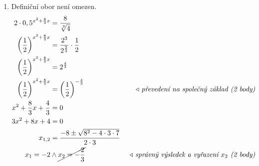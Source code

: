 \begin{center}
\begin{enumerate}
    \item Definiční obor není omezen.
    \begin{align*}
      \begin{aligned}
        2\cdot0,5^{x^2+\frac{8}{3}x}&=\frac{8}{\sqrt[3]{4}}\\
        \left(\frac{1}{2}\right)^{x^2+\frac{8}{3}x}&=\frac{2^3}{2^{\frac{2}{3}}}\cdot\frac{1}{2}\\
        \left(\frac{1}{2}\right)^{x^2+\frac{8}{3}x}&=2^{\frac{4}{3}}\\
        \left(\frac{1}{2}\right)^{x^2+\frac{8}{3}x}&=\left(\frac{1}{2}\right)^{-\frac{4}{3}}& \text{\rightnote{převedení na společný základ (2 body)}}\\
        x^2+\frac{8}{3}x +\frac{4}{3} &= 0\\
        3x^2+8x +4 &= 0\\
        x_{1,2}&=\frac{-8\pm\sqrt{8^2-4\cdot 3\cdot7}}{2\cdot 3} & \\
        x_1=-2 &\land \cancel{x_2=-\frac{2}{3}} & \text{\rightnote{správný výsledek a vyřazení $x_2$ (2 body)}}
      \end{aligned}
    \end{align*}
\end{enumerate}
\end{center}
